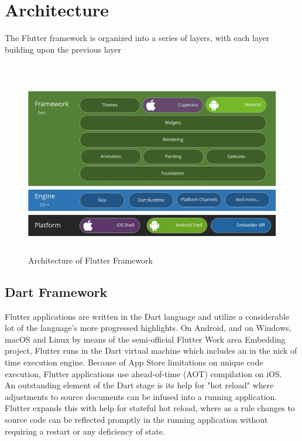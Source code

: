 \chapter{Architecture}

The Flutter framework is organized into a series of layers, with each layer building upon the previous layer\\\\
\begin{figure}[h]
  \begin{center}
  \includegraphics[height=80mm]{Images & Logos/CH_02_architecture.jpg}
  \end{center}
  \caption{Architecture of Flutter Framework}
\end{figure}  
  




\section{Dart Framework}

Flutter applications are written in the Dart language and utilize a considerable lot of the language's more
progressed highlights. On Android, and on Windows, macOS and Linux by means of the semi-official Flutter
Work area Embedding project, Flutter runs in the Dart virtual machine which includes an in the nick of time
execution engine. Because of App Store limitations on unique code execution, Flutter applications use ahead-of-time (AOT) compilation on iOS.\\
An outstanding element of the Dart stage is its help for "hot reload" where adjustments to
source documents can be infused into a running application. Flutter expands this with help for stateful hot
reload, where as a rule changes to source code can be reflected promptly in the running application
without requiring a restart or any deficiency of state.

